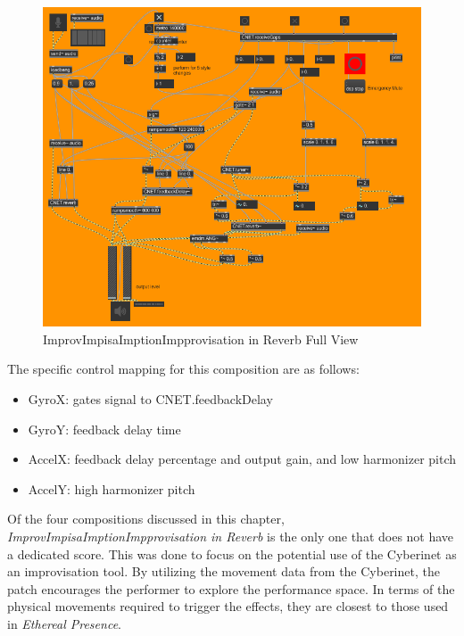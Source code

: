\begin{figure}
    \centering
    \includegraphics{diagrams/maxPatches/improvRaw.png}
    \caption{ImprovImpisaImptionImpprovisation in Reverb Full View}
    \label{fig:improvFull}
\end{figure}

The specific control mapping for this composition are as follows: 

\begin{itemize}
    \item GyroX: gates signal to CNET.feedbackDelay~
    \item GyroY: feedback delay time
    \item AccelX: feedback delay percentage and output gain, and low harmonizer pitch
    \item AccelY: high harmonizer pitch
\end{itemize}

Of the four compositions discussed in this chapter, \textit{ImprovImpisaImptionImpprovisation in Reverb} is the only one that does not have a dedicated score. This was done to focus on the potential use of the Cyberinet as an improvisation tool. By utilizing the movement data from the Cyberinet, the patch encourages the performer to explore the performance space. In terms of the physical movements required to trigger the effects, they are closest to those used in \textit{Ethereal Presence}. 

